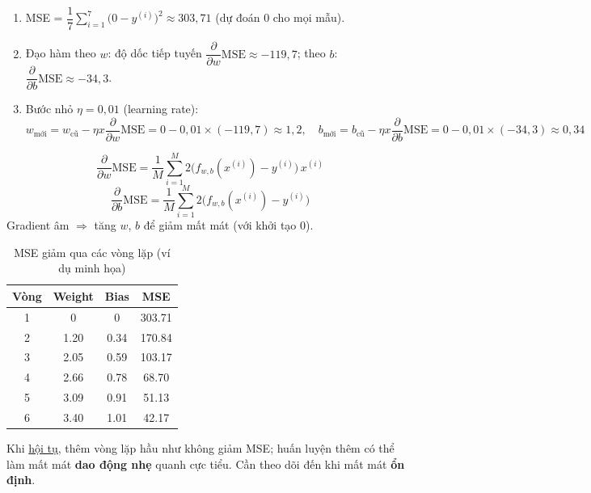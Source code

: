 \documentclass[12pt,a4paper]{article}
\begin{document}
\begin{phuongphap}[title={Khởi tạo $w=0$, $b=0$ và tính MSE}]
\begin{enumerate}
  \item MSE = $\dfrac{1}{7}\displaystyle\sum_{i=1}^{7}\bigl(0 - y^{(i)}\bigr)^2 \approx 303{,}71$ (dự đoán 0 cho mọi mẫu).
  \item Đạo hàm theo $w$: độ dốc tiếp tuyến $\dfrac{\partial}{\partial w}\text{MSE} \approx -119{,}7$; theo $b$: $\dfrac{\partial}{\partial b}\text{MSE} \approx -34{,}3$.
  \item Bước nhỏ $\eta = 0{,}01$ (learning rate):
  \[
    w_{\text{mới}} = w_{\text{cũ}} - \eta x \dfrac{\partial}{\partial w}\text{MSE} = 0 - 0{,}01 \times (-119{,}7) \approx 1{,}2,\quad
    b_{\text{mới}} = b_{\text{cũ}} - \eta x \dfrac{\partial}{\partial b}\text{MSE} = 0 - 0{,}01 \times (-34{,}3) \approx 0{,}34
  \]
\end{enumerate}
\end{phuongphap}

\begin{congthuc}[title={Đạo hàm MSE}]
\[
  \dfrac{\partial}{\partial w}\text{MSE}
  = \dfrac{1}{M}\displaystyle\sum_{i=1}^{M} 2\bigl(f_{w,b}(x^{(i)}) - y^{(i)}\bigr)\, x^{(i)}
\]
\[
  \dfrac{\partial}{\partial b}\text{MSE}
  = \dfrac{1}{M}\displaystyle\sum_{i=1}^{M} 2\bigl(f_{w,b}(x^{(i)}) - y^{(i)}\bigr)
\]
Gradient âm $\Rightarrow$ tăng $w$, $b$ để giảm mất mát (với khởi tạo 0).
\end{congthuc}

\begin{table}[H]
\centering
\caption{MSE giảm qua các vòng lặp (ví dụ minh họa)}
\begin{tabular}{cccc}
\textbf{Vòng} & \textbf{Weight} & \textbf{Bias} & \textbf{MSE} \\
\midrule
1 & 0 & 0 & 303.71 \\
2 & 1.20 & 0.34 & 170.84 \\
3 & 2.05 & 0.59 & 103.17 \\
4 & 2.66 & 0.78 & 68.70 \\
5 & 3.09 & 0.91 & 51.13 \\
6 & 3.40 & 1.01 & 42.17 \\
\end{tabular}
\end{table}

\begin{luuy}[title={Hội tụ và huấn luyện quá lâu}]
Khi \href{https://developers.google.com/machine-learning/glossary\#convergence}{hội tụ}, thêm vòng lặp hầu như không giảm MSE; huấn luyện thêm có thể làm mất mát \textbf{dao động nhẹ} quanh cực tiểu. Cần theo dõi đến khi mất mát \textbf{ổn định}.
\end{luuy}
\end{document}
